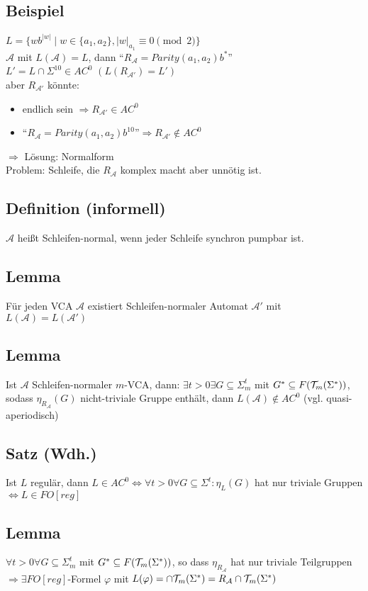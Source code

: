     \subsection{Beispiel}
        $L=\{wb^{|w|}\mid w\in\{a_1,a_2\},|w|_{a_1}\equiv 0\pmod 2\}$\\
        $\mathcal{A}$ mit $L(\mathcal{A})=L$, dann ``$R_\mathcal{A}=Parity(a_1,a_2)b^*$''\\
        $L'=L\cap\Sigma^{10}\in AC^0$ $(L(R_{\mathcal{A}'})=L')$\\
        aber $R_{\mathcal{A}'}$ könnte:
        \begin{itemize}
            \item endlich sein $\Rightarrow R_{\mathcal{A}'}\in AC^0$
            \item ``$R_\mathcal{A}=Parity(a_1,a_2)b^{10}$''$\Rightarrow R_{\mathcal{A}'}\not\in AC^0$
        \end{itemize}
        $\Rightarrow$ Lösung: Normalform\\
        Problem: Schleife, die $R_\mathcal{A}$ komplex macht aber unnötig ist.
    \subsection{Definition (informell)}
        $\mathcal{A}$ heißt Schleifen-normal, wenn jeder Schleife synchron pumpbar ist.
    \subsection{Lemma}
        Für jeden VCA $\mathcal {A}$ existiert Schleifen-normaler Automat $\mathcal{A}'$ mit $L(\mathcal{A})=L(\mathcal{A}')$
    \subsection{Lemma}
        Ist $\mathcal{A}$ Schleifen-normaler $m$-VCA, dann: $\exists t>0\exists G\subseteq\Sigma^t_m$ mit $G^*\subseteq F(\mathcal{T}_m(\Sigma^*))$, sodass $\eta_{R_\mathcal{A}}(G)$ nicht-triviale Gruppe enthält, dann $L(\mathcal{A})\not\in AC^0$ (vgl. quasi-aperiodisch)
    \subsection{Satz (Wdh.)}
        Ist $L$ regulär, dann $L\in AC^0\Leftrightarrow\forall t>0\forall G\subseteq\Sigma^t:\eta_L(G)$ hat nur triviale Gruppen $\Leftrightarrow L\in FO[reg]$
    \subsection{Lemma}
        $\forall t>0\forall G\subseteq\Sigma_m^t$ mit $G^*\subseteq F(\mathcal{T}_m(\Sigma^*))$, so dass $\eta_{R_\mathcal{A}}$ hat nur triviale Teilgruppen $\Rightarrow\exists FO[reg]$-Formel $\varphi$ mit $L(\varphi)=\cap\mathcal{T}_m(\Sigma^*)=R_\mathcal{A}\cap\mathcal{T}_m(\Sigma^*)$
